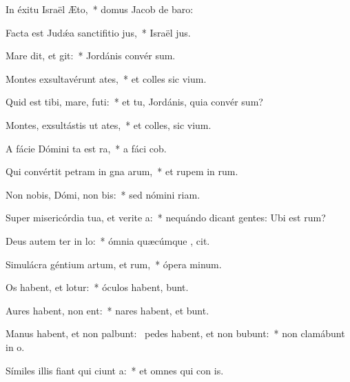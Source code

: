 \item In éxitu Israël  Æto,~* domus Jacob de  baro:
\item Facta est Judǽa sanctifitio jus,~* Israël  jus.
\item Mare dit, et git:~* Jordánis convér  sum.
\item Montes exsultavérunt  ates,~* et colles sic  vium.
\item Quid est tibi, mare,  futi:~* et tu, Jordánis, quia convér  sum?
\item Montes, exsultástis ut ates,~* et colles, sic  vium.
\item A fácie Dómini ta est ra,~* a fáci  cob.
\item Qui convértit petram in gna arum,~* et rupem in  rum.
\item Non nobis, Dómi, non bis:~* sed nómini   riam.
\item Super misericórdia tua, et verite a:~* nequándo dicant gentes: Ubi est  rum?
\item Deus autem ter in lo:~* ómnia quæcúmque , cit.
\item Simulácra géntium artum, et rum,~* ópera  minum.
\item Os habent, et  lotur:~* óculos habent,   bunt.
\item Aures habent,  non ent:~* nares habent, et  bunt.
\item Manus habent, et non palbunt:~\pscross{} pedes habent, et non bubunt:~* non clamábunt in  o.
\item Símiles illis fiant qui ciunt a:~* et omnes qui con  is.
